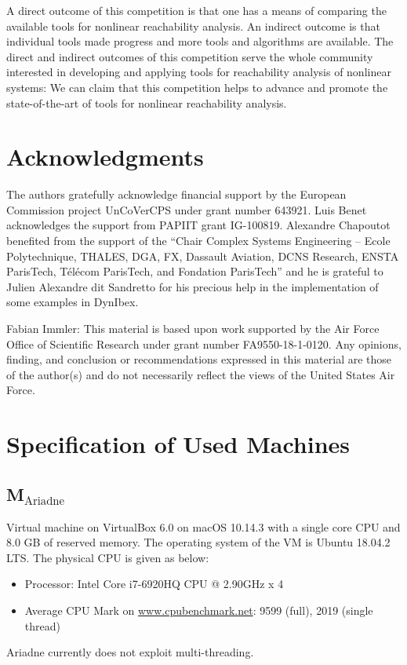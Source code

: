 \documentclass[EPiC]{easychair}
\begin{document}
A direct outcome of this competition is that one has a means of comparing the available tools for nonlinear reachability analysis. An indirect outcome is that individual tools made progress and more tools and algorithms are available.
The direct and indirect outcomes of this competition serve the whole community interested in developing and applying tools for reachability analysis of nonlinear systems: We can claim that this competition helps to advance and promote the state-of-the-art of tools for nonlinear reachability analysis.

\section{Acknowledgments}
\label{sect:acks}


The authors gratefully acknowledge financial support by the European Commission project UnCoVerCPS under grant number 643921. Luis Benet acknowledges the support from PAPIIT grant IG-100819. Alexandre Chapoutot benefited from the support of the “Chair Complex Systems Engineering – Ecole Polytechnique, THALES, DGA, FX, Dassault Aviation, DCNS Research, ENSTA ParisTech, Télécom ParisTech, and Fondation ParisTech”  and he is grateful to Julien Alexandre dit Sandretto for his precious help in the implementation of some examples in DynIbex.

Fabian Immler: This material is based upon work supported by the Air Force Office of Scientific Research under grant number FA9550-18-1-0120. Any opinions, finding, and conclusion or recommendations expressed in this material are those of the author(s) and do not necessarily reflect the views of the United States Air Force.

\appendix
\section{Specification of Used Machines} \label{sec:machines}

\subsection{\texorpdfstring{M$_{\text{Ariadne}}$}{M-Ariadne}} \label{sec:machine:Ariadne}
Virtual machine on VirtualBox 6.0 on macOS 10.14.3 with a single core CPU and 8.0 GB of reserved memory. The operating system of the VM is Ubuntu 18.04.2 LTS. The physical CPU is given as below:
\begin{itemize}
    \item Processor: Intel Core i7-6920HQ CPU @ 2.90GHz x 4 
    \item Average CPU Mark on \url{www.cpubenchmark.net}: 9599 (full), 2019 (single thread)
\end{itemize}
Ariadne currently does not exploit multi-threading.
\end{document}
